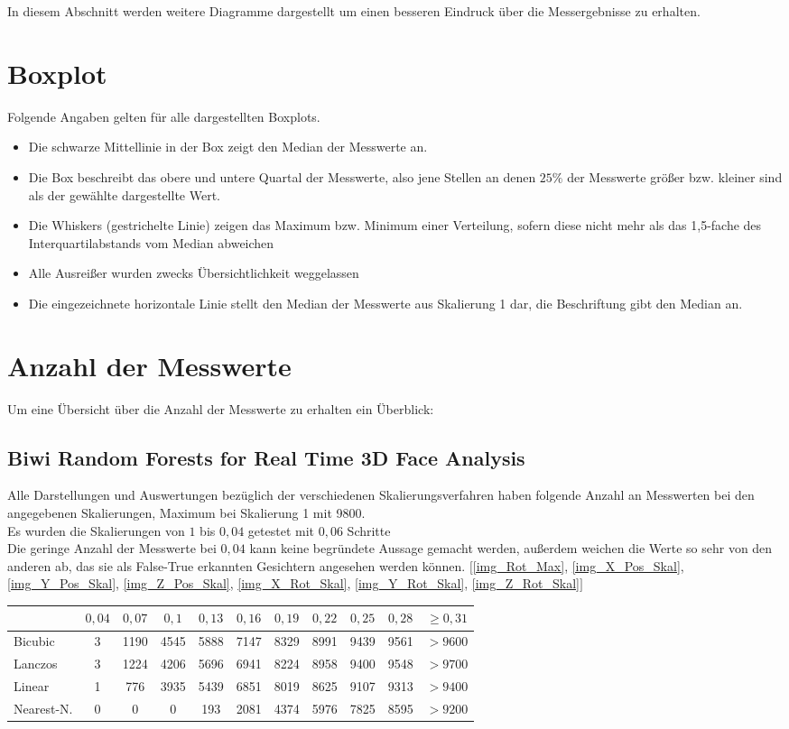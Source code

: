 \label{Abbildungen}
In diesem Abschnitt werden weitere Diagramme dargestellt um einen besseren Eindruck über die Messergebnisse zu erhalten.
\section{Boxplot}
Folgende Angaben gelten für alle dargestellten Boxplots.
\begin{itemize}
	\item Die schwarze Mittellinie in der Box zeigt den Median der Messwerte an.
	\item Die Box beschreibt das obere und untere Quartal der Messwerte, also jene Stellen an denen $25\%$ der Messwerte größer bzw. kleiner sind als der gewählte dargestellte Wert.
	\item \glqq Die Whiskers (gestrichelte Linie) zeigen das Maximum bzw. Minimum einer Verteilung, sofern diese nicht mehr als das 1,5-fache des Interquartilabstands vom Median abweichen\grqq 
	\cite{wiki_Boxplot}
	\item Alle Ausreißer wurden zwecks Übersichtlichkeit weggelassen
	\item Die eingezeichnete horizontale Linie stellt den Median der Messwerte aus Skalierung 1 dar, die Beschriftung gibt den Median an.
\end{itemize}
\section{Anzahl der Messwerte}
Um eine Übersicht über die Anzahl der Messwerte zu erhalten ein Überblick:
\subsection{Biwi Random Forests for Real Time 3D Face Analysis \cite{database_Face_Ori}}
Alle Darstellungen und Auswertungen bezüglich der verschiedenen Skalierungsverfahren haben folgende Anzahl an Messwerten bei den angegebenen Skalierungen, Maximum bei Skalierung 1 mit 9800.\\
Es wurden die Skalierungen von $1$ bis $0,04$ getestet mit $0,06$ Schritte\\ 
Die geringe Anzahl der Messwerte bei $0,04$ kann keine begründete Aussage gemacht werden, außerdem weichen die Werte so sehr von den anderen ab, das sie als False-True erkannten Gesichtern angesehen werden können.
$[$\autoref{img_Rot_Max}, \autoref{img_X_Pos_Skal}, \autoref{img_Y_Pos_Skal}, \autoref{img_Z_Pos_Skal}, \autoref{img_X_Rot_Skal}, \autoref{img_Y_Rot_Skal}, \autoref{img_Z_Rot_Skal}$]$\\
\begin{tabular}{|l|c|c|c|c|c|c|c|c|c|c|}
	\hline 
	&$0,04$&$0,07$&$0,1$&$0,13$&$0,16$&$0,19$&$0,22$&$0,25$&$0,28$&$\geq0,31$\\
	\hline 
	Bicubic&3&1190&4545&5888&7147&8329&8991&9439&9561&$>9600$\\
	\hline 
	Lanczos&3&1224&4206&5696&6941&8224&8958&9400&9548&$>9700$\\
	\hline 
	Linear&1&776&3935&5439&6851&8019&8625&9107&9313&$>9400$\\
	\hline 
	Nearest-N.&0&0&0&193&2081&4374&5976&7825&8595&$>9200$\\ 
	\hline 
\end{tabular} 
